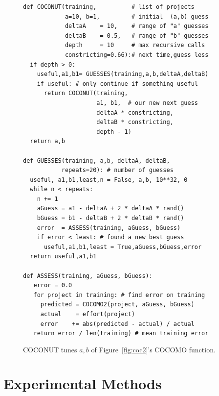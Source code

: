 \documentclass{sig-alternate}
\newcommand{\fig}[1]{Figure~\ref{fig:#1}}
\begin{document}
\begin{figure}[!t]
\begin{lstlisting}
def COCONUT(training,          # list of projects
            a=10, b=1,         # initial  (a,b) guess
            deltaA    = 10,    # range of "a" guesses 
            deltaB    = 0.5,   # range of "b" guesses
            depth     = 10     # max recursive calls
            constricting=0.66):# next time,guess less
  if depth > 0:
    useful,a1,b1= GUESSES(training,a,b,deltaA,deltaB)
    if useful: # only continue if something useful
      return COCONUT(training, 
                     a1, b1,  # our new next guess
                     deltaA * constricting,
                     deltaB * constricting,
                     depth - 1)
  return a,b

def GUESSES(training, a,b, deltaA, deltaB,
           repeats=20): # number of guesses
  useful, a1,b1,least,n = False, a,b, 10**32, 0
  while n < repeats:
    n += 1
    aGuess = a1 - deltaA + 2 * deltaA * rand()
    bGuess = b1 - deltaB + 2 * deltaB * rand()
    error  = ASSESS(training, aGuess, bGuess)
    if error < least: # found a new best guess
      useful,a1,b1,least = True,aGuess,bGuess,error
  return useful,a1,b1

def ASSESS(training, aGuess, bGuess):
   error = 0.0
   for project in training: # find error on training
     predicted = COCOMO2(project, aGuess, bGuess)
     actual    = effort(project)
     error    += abs(predicted - actual) / actual
   return error / len(training) # mean training error
\end{lstlisting}
\caption{COCONUT  tunes  $a,b$ 
of \fig{coc2}'s COCOMO function.}\label{fig:coconut}
\end{figure}

 






\section{Experimental Methods} 

\end{document}
